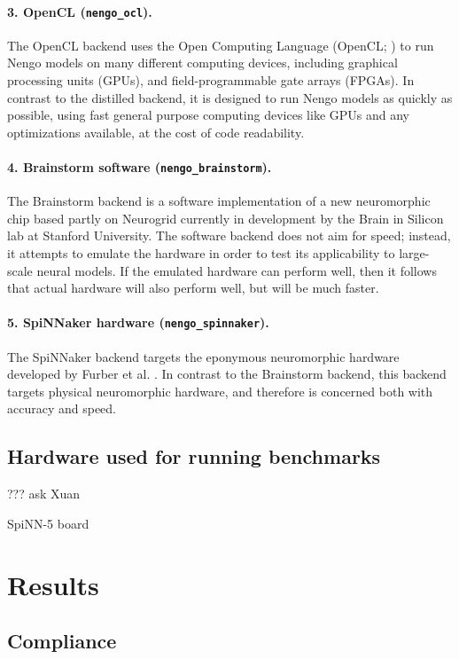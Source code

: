\documentclass{frontiersSCNS}
\begin{document}
\paragraph{3. OpenCL (\texttt{nengo\_ocl}).}
The OpenCL backend uses the Open Computing Language
(OpenCL; \cite{???})
to run Nengo models on many different computing devices,
including graphical processing units (GPUs),
and field-programmable gate arrays (FPGAs).
In contrast to the distilled backend,
it is designed to run Nengo models
as quickly as possible,
using fast general purpose computing devices
like GPUs and any optimizations available,
at the cost of code readability.

\paragraph{4. Brainstorm software (\texttt{nengo\_brainstorm}).}
The Brainstorm backend is a software implementation
of a new neuromorphic chip
based partly on Neurogrid \cite{???}
currently in development
by the Brain in Silicon lab
at Stanford University.
The software backend does not aim for speed;
instead, it attempts to emulate the hardware
in order to test its applicability
to large-scale neural models.
If the emulated hardware can perform well,
then it follows that actual hardware
will also perform well,
but will be much faster.

\paragraph{5. SpiNNaker hardware (\texttt{nengo\_spinnaker}).}
The SpiNNaker backend \cite{Mundy et al., 2015 in press}
targets the eponymous neuromorphic hardware
developed by Furber et al. \cite{10.1109/JPROC.2014.2304638}.
In contrast to the Brainstorm backend,
this backend targets physical neuromorphic hardware,
and therefore is concerned
both with accuracy and speed.

\subsection{Hardware used for running benchmarks}

??? ask Xuan

SpiNN-5 board

\section{Results}

\subsection{Compliance}
\end{document}

